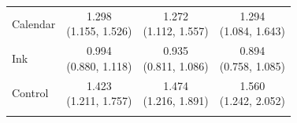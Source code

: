 {\begin{tabular}{lccc}
\addlinespace
\hspace{1em}Calendar & \makecell[c]{1.298\\(1.155, 1.526)} & \makecell[c]{1.272\\(1.112, 1.557)} & \makecell[c]{1.294\\(1.084, 1.643)}\\
\addlinespace
\hspace{1em}Ink & \makecell[c]{0.994\\(0.880, 1.118)} & \makecell[c]{0.935\\(0.811, 1.086)} & \makecell[c]{0.894\\(0.758, 1.085)}\\
\addlinespace
\hspace{1em}Control & \makecell[c]{1.423\\(1.211, 1.757)} & \makecell[c]{1.474\\(1.216, 1.891)} & \makecell[c]{1.560\\(1.242, 2.052)}\\
\addlinespace
\bottomrule
\end{tabular}%
}
